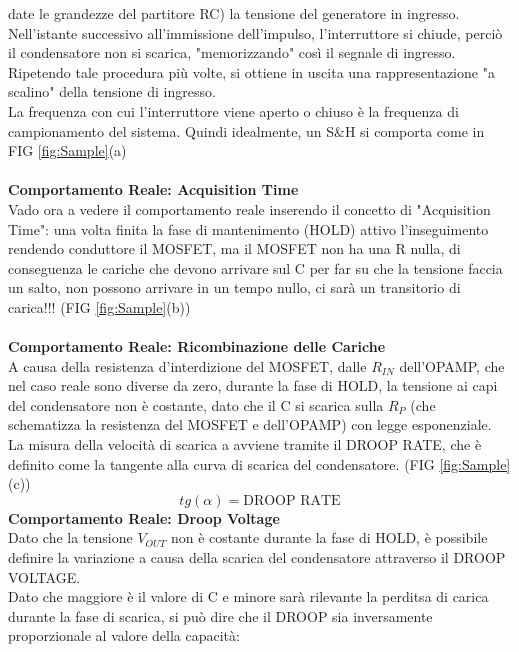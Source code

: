 \documentclass{article}
\begin{document}
date le grandezze del partitore RC) la tensione del generatore in ingresso.\\
Nell'istante successivo all'immissione dell'impulso, l'interruttore si chiude, perciò il condensatore non si scarica, 
"memorizzando" così il segnale di ingresso.\\
Ripetendo tale procedura più volte, si ottiene in uscita 
una rappresentazione "a scalino" della tensione di ingresso.\\
La frequenza con cui l'interruttore 
viene aperto o chiuso è la frequenza di campionamento del sistema.
Quindi idealmente, un S\&H si comporta come in FIG \ref{fig:Sample}(a)\\\\
\textbf{Comportamento Reale: Acquisition Time}\\
Vado ora a vedere il comportamento reale inserendo il concetto di "Acquisition Time": una volta finita la fase di mantenimento (HOLD) attivo l'inseguimento rendendo conduttore il MOSFET, ma il MOSFET non ha una R nulla, di conseguenza le cariche che devono arrivare sul C per far su che la tensione faccia un salto, non possono arrivare in un tempo nullo, ci sarà un transitorio di carica!!! (FIG \ref{fig:Sample}(b))\\\\
\textbf{Comportamento Reale: Ricombinazione delle Cariche}\\
A causa  della resistenza d'interdizione del MOSFET, dalle $R_{IN}$ dell'OPAMP, che nel caso reale sono diverse da zero, durante la fase di HOLD, la tensione ai capi del condensatore non è costante, dato che il C si scarica sulla $R_{P}$ (che schematizza la resistenza del MOSFET e dell'OPAMP) con legge esponenziale.\\
La misura della velocità di scarica a avviene tramite il DROOP RATE, che è definito come la tangente alla curva di scarica del condensatore. (FIG \ref{fig:Sample} (c))
\begin{equation}
    tg(\alpha)=\text{DROOP RATE} 
\end{equation}
\newpage
\noindent
\textbf{Comportamento Reale: Droop Voltage}\\
Dato che la tensione $V_{OUT}$ non è costante durante la fase di HOLD, è possibile definire la variazione a causa della scarica del condensatore attraverso il DROOP VOLTAGE.\\
Dato che maggiore è il valore di C e minore sarà rilevante la perditsa di carica durante la fase di scarica, si può dire che il DROOP sia inversamente proporzionale al valore della capacità:
\end{document}
